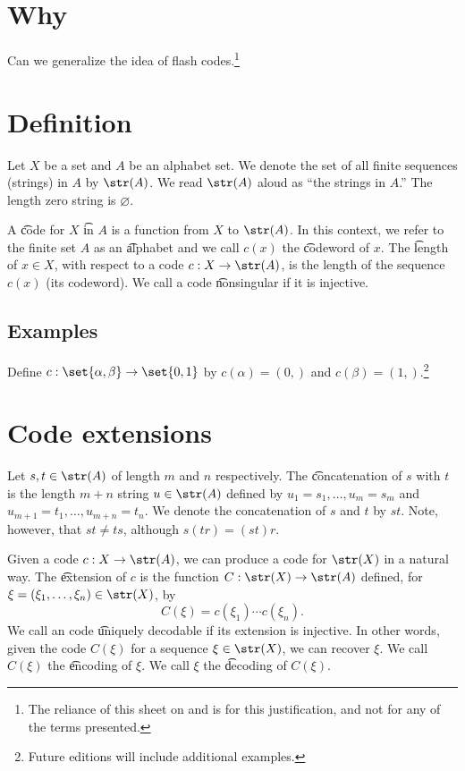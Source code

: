 

\section*{Why}

Can we generalize the idea of flash codes.\footnote{The reliance of this sheet on and is for this justification, and not for any of the terms presented.}

\section*{Definition}

Let $X$ be a set and $A$ be an alphabet set.
We denote the set of all finite sequences (strings) in $A$ by $\str(A)$.
We read $\str(A)$ aloud as ``the strings in $A$.''
The length zero string is $\varnothing$.

A \t{code} for $X$ \t{in} $A$ is a function from $X$ to $\str(A)$.
In this context, we refer to the finite set $A$ as an \t{alphabet} and we call $c(x)$ the \t{codeword} of $x$.
The \t{length} of $x \in X$, with respect to a code $c: X \to \str(A)$, is the length of the sequence $c(x)$ (its codeword).
We call a code \t{nonsingular} if it is injective.

\subsection*{Examples}

Define $c: \set{\alpha , \beta } \to \set{0, 1}$ by $c(\alpha ) = (0,)$ and $c(\beta ) = (1,)$.\footnote{Future editions will include additional examples.}

\section*{Code extensions}


Let $s,t \in \str(A)$ of length $m$ and $n$ respectively.
The \t{concatenation} of $s$ with $t$ is the length $m+n$ string $u \in \str(A)$ defined by $u_{1} = s_1, \dots , u_m = s_m$ and $u_{m+1} = t_1, \dots , u_{m+n} = t_n$.
We denote the concatenation of $s$ and $t$ by $st$.
Note, however, that $st \neq ts$, although $s(tr) = (st)r$.

Given a code $c: X \to \str(A)$, we can produce a code for $\str(X)$ in a natural way.
The \t{extension} of $c$ is the function $C: \str(X) \to \str(A)$ defined, for $\xi  = (\xi _1, \dots , \xi _n) \in \str(X)$, by
\[
C(\xi ) = c(\xi _1) \cdots c(\xi _n).
\]
We call an code \t{uniquely decodable} if its extension is injective.
In other words, given the code $C(\xi )$ for a sequence $\xi \in \str(X)$, we can recover $\xi $.
We call $C(\xi )$ the \t{encoding} of $\xi $.
We call $\xi $ the \t{decoding} of $C(\xi )$.
